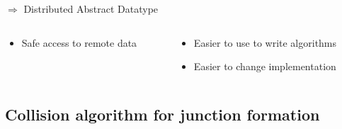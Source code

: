 \documentclass[aspectratio=1610,t,10pt]{beamer}
\begin{document}
\begin{frame}
\begin{block}{$\Rightarrow$ Distributed Abstract Datatype}
\begin{columns}[c]
\begin{column}{.48\textwidth}
\begin{itemize}
				\item Safe access to remote data
			\end{itemize}
		\end{column}
		\begin{column}{.48\textwidth}
			\begin{itemize}
				\item Easier to use to write algorithms
				\item Easier to change implementation
			\end{itemize}
		\end{column}
	\end{columns}
\end{block}
\end{frame}



\subsection{Collision algorithm for junction formation}
\end{document}
